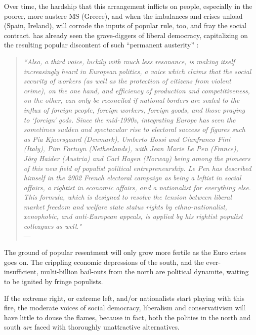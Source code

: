 Over time, the hardship that this arrangement inflicts on people, especially in the poorer, more austere \gls{MS} (Greece), and when the imbalances and crises unload (Spain, Ireland), will corrode the inputs of popular rule, too, and fray the social contract.
\citeauthor{Offe2003} has already seen the grave-diggers of liberal democracy, capitalizing on the resulting popular discontent of such ``permanent austerity'' \citep{Streeck2010c}:
\begin{quote}
	\emph{``Also, a third voice, luckily with much less resonance, is making itself increasingly heard in European politics, a voice which claims that the social security of workers (as well as the protection of citizens from violent crime), on the one hand, and efficiency of production and competitiveness, on the other, can only be reconciled if national borders are sealed to the influx of foreign people, foreign workers, foreign goods, and those praying to `foreign' gods.
Since the mid-1990s, integrating Europe has seen the sometimes sudden and spectacular rise to electoral success of figures such as Pia Kjaersgaard (Denmark), Umberto Bossi and Gianfranco Fini (Italy), Pim Fortuyn (Netherlands), with Jean Marie Le Pen (France), J\"{o}rg Haider (Austria) and Carl Hagen (Norway) being among the pioneers of this new field of populist political entrepreneurship.
Le Pen has described himself in the 2002 French electoral campaign as being a leftist in social affairs, a rightist in economic affairs, and a nationalist for everything else.
This formula, which is designed to resolve the tension between liberal market freedom and welfare state status rights by ethno-nationalist, xenophobic, and anti-European appeals, is applied by his rightist populist colleagues as well."}\\
	--- \cite[454]{Offe2003}
\end{quote}

The ground of popular resentment will only grow more fertile as the Euro crises goes on.
The crippling economic depressions of the south, and the ever-insufficient, multi-billion bail-outs from the north are political dynamite, waiting to be ignited by fringe populists.

If the extreme right, or extreme left, and/or nationalists start playing with this fire, the moderate voices of social democracy, liberalism and conservativism will have little to douse the flames, because in fact, both the polities in the north and south \emph{are} faced with thoroughly unattractive alternatives.

